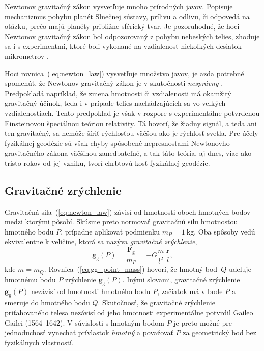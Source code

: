 \documentclass[a4paper, 12pt]{book}
\newcommand{\gidx}{\mathrm g}
\let\vec\mathbf
\begin{document}
Newtonov gravitačný zákon vysvetľuje mnoho prírodných javov.  Popisuje 
mechanizmus pohybu planét Slnečnej sústavy, prílivu a odlivu, či odpovedá na 
otázku, prečo majú planéty približne sférický tvar.  Je pozoruhodné, že hoci 
Newtonov gravitačný zákon bol odpozorovaný z pohybu nebeských telies, zhoduje 
sa i s experimentmi, ktoré boli vykonané na vzdialenosť niekoľkých desiatok 
mikrometrov \citep{Lee2020}.

Hoci rovnica~(\ref{eq:newton_law}) vysvetľuje množstvo javov, je azda 
potrebné spomenúť, že Newtonov gravitačný zákon je v skutočnosti 
\emph{nesprávny} \citep{Feynman}.  Predpokladá napríklad, že zmena hmotnosti či 
vzdialenosti má okamžitý gravitačný účinok, teda i v prípade telies 
nachádzajúcich sa vo veľkých vzdialenostiach.  Tento predpoklad je však 
v rozpore s experimentálne potvrdenou Einsteinovou špeciálnou teóriou 
relativity.  Tá hovorí, že žiadny signál, a teda ani ten gravitačný, sa nemôže 
šíriť rýchlosťou väčšou ako je rýchlosť svetla.  Pre účely fyzikálnej geodézie 
sú však chyby spôsobené nepresnosťami Newtonovho gravitačného zákona väčšinou 
zanedbateľné, a tak táto teória, aj dnes, viac ako tristo rokov od jej vzniku, 
tvorí chrbtovú kosť fyzikálnej geodézie.

\subsection{Gravitačné zrýchlenie}
\label{sec:gg}

Gravitačná sila~(\ref{eq:newton_law}) závisí od hmotnosti oboch hmotných 
bodov medzi ktorými pôsobí.  Skúsme preto normovať gravitačnú silu hmotnosťou 
hmotného bodu $P$, prípadne aplikovať podmienku $m_P = 1\ \mathrm{kg}$.  Oba 
spôsoby vedú ekvivalentne k veličine, ktorá sa nazýva \emph{gravitačné 
zrýchlenie},
%
\begin{equation}
\label{eq:gg_point_mass}
\vec g_\gidx(P) = \frac{\vec F_\gidx}{m_P} = -G \frac{m}{l^2} \, \frac{\vec 
r}{l}{,}
\end{equation}
%
kde $m = m_Q$.  Rovnica~(\ref{eq:gg_point_mass}) hovorí, že hmotný 
bod~$Q$ udeľuje hmotnému bodu $P$ zrýchlenie $\vec g_\gidx(P)$.   Inými 
slovami, gravitačné zrýchlenie $\vec g_\gidx(P)$ nezávisí od hmotnosti hmotného 
bodu $P$, začiatok má v bode $P$ a smeruje do hmotného bodu $Q$.  Skutočnosť, 
že gravitačné zrýchlenie priťahovaného telesa nezávisí od jeho hmotnosti 
experimentálne potvrdil Gaileo Gailei (1564--1642).  V súvislosti s hmotným 
bodom $P$ je preto možné pre jednoduchosť vynechať prívlastok \emph{hmotný} 
a považovať $P$ za geometrický bod bez fyzikálnych vlastností.
\end{document}
